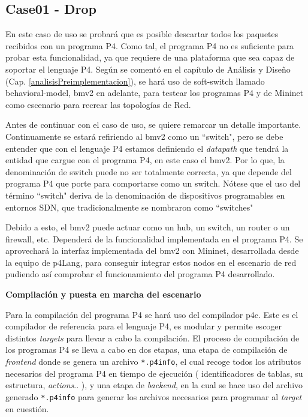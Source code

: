 \subsection{Case01 - Drop}
\label{p4_ether_case01}
En este caso de uso se probará que es posible descartar todos los paquetes recibidos con un programa P4. Como tal, el programa P4 no es suficiente para probar esta funcionalidad, ya que requiere de una plataforma que sea capaz de soportar el lenguaje P4. Según se comentó en el capítulo de Análisis y Diseño (Cap. \ref{analisisPreimplementacion}), se hará uso de soft-switch llamado behavioral-model, \gls{bmv2} en adelante, para testear los programas P4 y de Mininet como escenario para recrear las topologías de Red. \\
\par

Antes de continuar con el caso de uso, se quiere remarcar un detalle importante. Continuamente se estará refiriendo al \gls{bmv2} como un ``switch", pero se debe entender que con el lenguaje P4 estamos definiendo el \textit{datapath} que tendrá la entidad que cargue con el programa P4, en este caso el  \gls{bmv2}. Por lo que, la denominación de switch puede no ser totalmente correcta, ya que depende del programa P4 que porte para comportarse como un switch. Nótese que el uso del término ``switch" deriva de la denominación de dispositivos programables en entornos SDN, que tradicionalmente se nombraron como ``switches" \\
\par

Debido a esto, el \gls{bmv2} puede actuar como un hub, un switch, un router o un firewall, etc. Dependerá de la funcionalidad implementada en el programa P4. Se aprovechará la interfaz implementada del \gls{bmv2} con Mininet, desarrollada desde la equipo de p4Lang, para conseguir integrar estos nodos en el escenario de red pudiendo así comprobar el funcionamiento del programa P4 desarrollado.\\
\par

\vspace{0.2cm}
\textbf{Compilación y puesta en marcha del escenario}\\
\par

Para la compilación del programa P4 se hará uso del compilador p4c. Este es el compilador de referencia para el lenguaje P4, es modular y permite escoger distintos \textit{targets} para llevar a cabo la compilación. El proceso de compilación de los programas P4 se lleva a cabo en dos etapas, una etapa de compilación de \textit{frontend} donde se genera un archivo \texttt{*.p4info}, el cual recoge todos los atributos necesarios del programa P4 en tiempo de ejecución ( identificadores de tablas, su estructura, \textit{actions}.. ), y una etapa de \textit{backend}, en la cual se hace uso del archivo generado \texttt{*.p4info} para generar los archivos necesarios para programar al \textit{target} en cuestión.\\
\par

